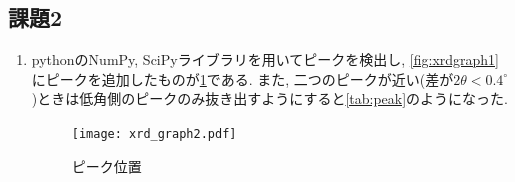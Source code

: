 \documentclass[11pt]{ltjsarticle}
\begin{document}
    \subsection*{課題2}
      \begin{enumerate}
        \item pythonのNumPy, SciPyライブラリを用いてピークを検出し, \cref{fig:xrdgraph1}にピークを追加したものが\cref{fig:xrdgraph2}である.
          また, 二つのピークが近い(差が$2\theta<0.4^\circ$)ときは低角側のピークのみ抜き出すようにすると\cref{tab:peak}のようになった.
          \begin{figure}[H]
            \centering
            \texttt{[image: xrd\_graph2.pdf]}
            \caption{ピーク位置}
            \label{fig:xrdgraph2}
          \end{figure}
          

\end{enumerate}
\end{document}
